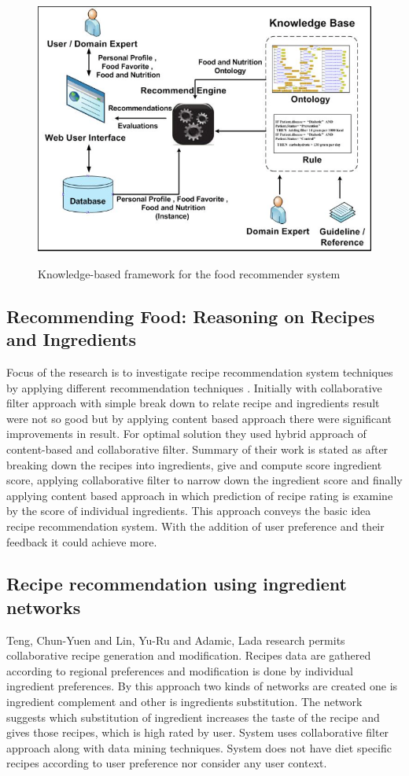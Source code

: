 \begin{figure}[h]
	\centering
	\includegraphics[width=.70\linewidth]{figures/ch2_suksom2010knowledge.png}
	\caption{Knowledge-based framework for the food recommender system}
	\cite{suksom2010knowledge}
	\label{fig:ch2_suksom2010knowledge}
\end{figure}

\subsection{Recommending Food: Reasoning on Recipes and Ingredients}

Focus of the research is to investigate recipe recommendation system techniques by applying different recommendation techniques \cite{freyne2010recommending}. Initially with collaborative filter approach with simple break down to relate recipe and ingredients result were not so good but by applying content based approach there were significant improvements in result. For optimal solution they used hybrid approach of content-based and collaborative filter. Summary of their work is stated as after breaking down the recipes into ingredients, give and compute score ingredient score, applying collaborative filter to narrow down the ingredient score and finally applying content based approach in which prediction of recipe rating is examine by the score of individual ingredients. This approach conveys the basic idea recipe recommendation system. With the addition of user preference and their feedback it could achieve more.

\subsection{Recipe recommendation using ingredient networks}

Teng, Chun-Yuen and Lin, Yu-Ru and Adamic, Lada \cite{teng2012recipe} research permits collaborative recipe generation and modification. Recipes data are gathered according to regional preferences and modification is done by individual ingredient preferences. By this approach two kinds of networks are created one is ingredient complement and other is ingredients substitution. The network suggests which substitution of ingredient increases the taste of the recipe and gives those recipes, which is high rated by user. System uses collaborative filter approach along with data mining techniques. System does not have diet specific recipes according to user preference nor consider any user context. 

